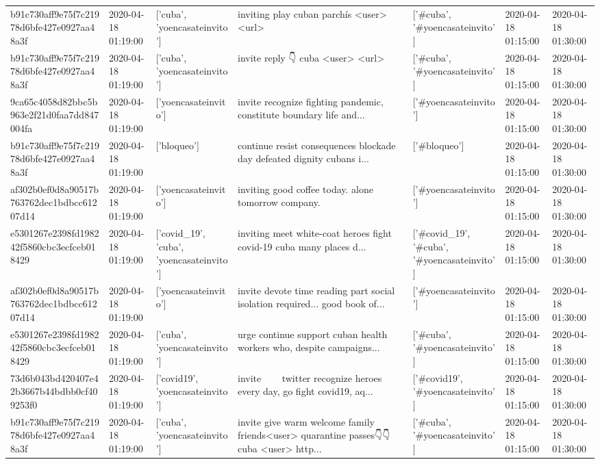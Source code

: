 \begin{tabular}{lllllll}
b91c730aff9e75f7c21978d6bfe427e0927aa48a3f & 2020-04-18 01:19:00 & ['cuba', 'yoencasateinvito'] & inviting play cuban parchís <user> <url> & ['#cuba', '#yoencasateinvito'] & 2020-04-18 01:15:00 & 2020-04-18 01:30:00 \\
b91c730aff9e75f7c21978d6bfe427e0927aa48a3f & 2020-04-18 01:19:00 & ['cuba', 'yoencasateinvito'] & invite reply 👇 cuba <user> <url> & ['#cuba', '#yoencasateinvito'] & 2020-04-18 01:15:00 & 2020-04-18 01:30:00 \\
9ca65c4058d82bbc5b963e2f21d0faa7dd847004fa & 2020-04-18 01:19:00 & ['yoencasateinvito'] & invite recognize fighting pandemic, constitute boundary life and... & ['#yoencasateinvito'] & 2020-04-18 01:15:00 & 2020-04-18 01:30:00 \\
b91c730aff9e75f7c21978d6bfe427e0927aa48a3f & 2020-04-18 01:19:00 & ['bloqueo'] & continue resist consequences blockade day defeated dignity cubans i... & ['#bloqueo'] & 2020-04-18 01:15:00 & 2020-04-18 01:30:00 \\
af302b0ef0d8a90517b763762dec1bdbcc61207d14 & 2020-04-18 01:19:00 & ['yoencasateinvito'] & inviting good coffee today. alone tomorrow company. & ['#yoencasateinvito'] & 2020-04-18 01:15:00 & 2020-04-18 01:30:00 \\
e5301267e2398fd198242f5860cbc3ecfceb018429 & 2020-04-18 01:19:00 & ['covid_19', 'cuba', 'yoencasateinvito'] & inviting meet white-coat heroes fight covid-19 cuba many places d... & ['#covid_19', '#cuba', '#yoencasateinvito'] & 2020-04-18 01:15:00 & 2020-04-18 01:30:00 \\
af302b0ef0d8a90517b763762dec1bdbcc61207d14 & 2020-04-18 01:19:00 & ['yoencasateinvito'] & invite devote time reading part social isolation required... good book of... & ['#yoencasateinvito'] & 2020-04-18 01:15:00 & 2020-04-18 01:30:00 \\
e5301267e2398fd198242f5860cbc3ecfceb018429 & 2020-04-18 01:19:00 & ['cuba', 'yoencasateinvito'] & urge continue support cuban health workers who, despite campaigns... & ['#cuba', '#yoencasateinvito'] & 2020-04-18 01:15:00 & 2020-04-18 01:30:00 \\
73d6b043bd420407e42b3667b44bdbb0cf409253f0 & 2020-04-18 01:19:00 & ['covid19', 'yoencasateinvito'] & invite 👏 👏 👏 twitter recognize heroes every day, go fight covid19, aq... & ['#covid19', '#yoencasateinvito'] & 2020-04-18 01:15:00 & 2020-04-18 01:30:00 \\
b91c730aff9e75f7c21978d6bfe427e0927aa48a3f & 2020-04-18 01:19:00 & ['cuba', 'yoencasateinvito'] & invite give warm welcome family friends<user> quarantine passes👇👇 cuba <user> http... & ['#cuba', '#yoencasateinvito'] & 2020-04-18 01:15:00 & 2020-04-18 01:30:00 \\

\end{tabular}
